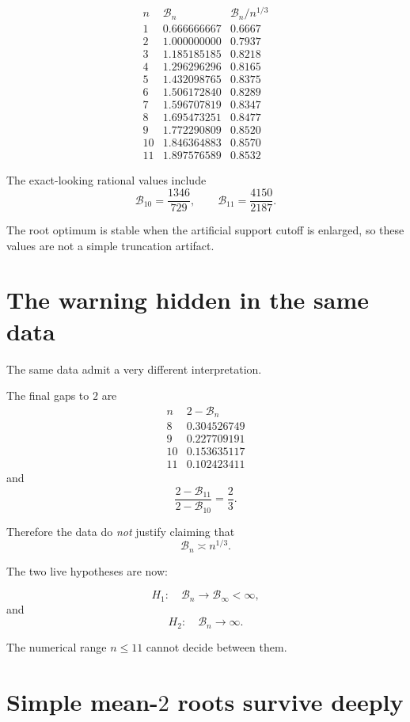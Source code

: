 \documentclass[11pt,a4paper]{article}
\newcommand{\cB}{\mathcal B}
\begin{document}
\[
\begin{array}{c|c|c}
n & \cB_n & \cB_n/n^{1/3}\\
\hline
1 & 0.666666667 & 0.6667\\
2 & 1.000000000 & 0.7937\\
3 & 1.185185185 & 0.8218\\
4 & 1.296296296 & 0.8165\\
5 & 1.432098765 & 0.8375\\
6 & 1.506172840 & 0.8289\\
7 & 1.596707819 & 0.8347\\
8 & 1.695473251 & 0.8477\\
9 & 1.772290809 & 0.8520\\
10& 1.846364883 & 0.8570\\
11& 1.897576589 & 0.8532
\end{array}
\]

The exact-looking rational values include
\[
\cB_{10}=\frac{1346}{729},
\qquad
\cB_{11}=\frac{4150}{2187}.
\]

The root optimum is stable when the artificial support cutoff is enlarged,
so these values are not a simple truncation artifact.

\section{The warning hidden in the same data}

The same data admit a very different interpretation.

The final gaps to \(2\) are
\[
\begin{array}{c|c}
n & 2-\cB_n\\
\hline
8&0.304526749\\
9&0.227709191\\
10&0.153635117\\
11&0.102423411
\end{array}
\]
and
\[
\frac{2-\cB_{11}}{2-\cB_{10}}
=
\frac23.
\]

Therefore the data do \emph{not} justify claiming that
\[
\cB_n\asymp n^{1/3}.
\]

The two live hypotheses are now:

\[
\boxed{
H_1:
\quad
\cB_n\to\cB_\infty<\infty,
}
\]
and
\[
\boxed{
H_2:
\quad
\cB_n\to\infty.
}
\]

The numerical range \(n\le11\) cannot decide between them.

\section{Simple mean-\(2\) roots survive deeply}
\end{document}
